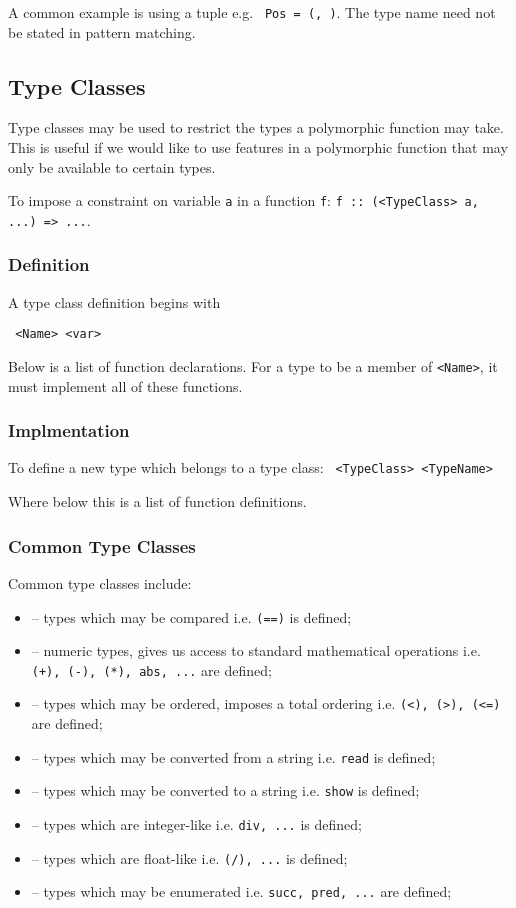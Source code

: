 A common example is using a tuple e.g. \texttt{ Pos = (, )}. The type name need not be stated in pattern matching.

\subsection{Type Classes}
Type classes may be used to restrict the types a polymorphic function may take. This is useful if we would like to use features in a polymorphic function that may only be available to certain types.

To impose a constraint on variable \texttt{a} in a function \texttt{f}: \texttt{f :: (\texttt<TypeClass> a, ...) => ...}.

\subsubsection{Definition}
A type class definition begins with

\texttt{ <Name> <var> }

Below is a list of function declarations. For a type to be a member of \texttt{<Name>}, it must implement all of these functions.

\subsubsection{Implmentation}
To define a new type which belongs to a type class:
\texttt{ <TypeClass> <TypeName> }

Where below this is a list of function definitions.

\subsubsection{Common Type Classes}
Common type classes include:
\begin{itemize}
  \item \texttt{} -- types which may be compared i.e. \texttt{(==)} is defined;
  \item \texttt{} -- numeric types, gives us access to standard mathematical operations i.e. \texttt{(+), (-), (*), abs, ...} are defined;
  \item \texttt{} -- types which may be ordered, imposes a total ordering i.e. \texttt{(<), (>), (<=)} are defined;
  \item \texttt{} -- types which may be converted from a string i.e. \texttt{read} is defined;
  \item \texttt{} -- types which may be converted to a string i.e. \texttt{show} is defined;
  \item \texttt{} -- types which are integer-like i.e. \texttt{div, ...} is defined;
  \item \texttt{} -- types which are float-like i.e. \texttt{(/), ...} is defined;
  \item \texttt{} -- types which may be enumerated i.e. \texttt{succ, pred, ...} are defined;
\end{itemize}

